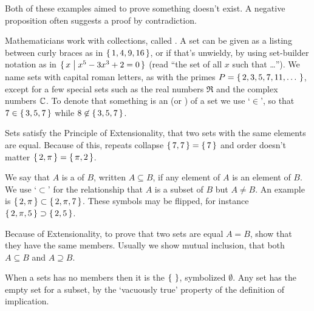 Both of these examples aimed to prove something doesn't exist.
A negative proposition often suggests a proof by contradiction.















Mathematicians work with collections, called . 
A set can be given as a listing between curly braces as in
\( \mbox{$\{\, 1,4,9,16 \,\}$} \), or if that's
unwieldy, by using set-builder notation as in
\( \mbox{$\{\,x\bigm| x^5-3x^3+2=0 \,\}$} \) (read ``the set of all \( x \)
such that \ldots'').
We name sets with capital roman letters, as with the primes
\( P=\mbox{$\{\,2,3,5,7,11,\ldots\,\,\}$} \), except for a few special sets such as the
real numbers \( \Re \)
and the complex numbers \( \mathbb{C} \).
To denote that something is an 
(or ) of a set we
use `\(\in \)',
so that \( 7\in\mbox{$\{\,3,5,7\,\}$} \) while \( 8\not\in\mbox{$\{\,3,5,7\,\}$} \).

Sets satisfy
the Principle of Extensionality, that two sets with the same elements
are equal.
Because of this, 
repeats collapse \( \mbox{$\{\,7,7\,\}$}=\mbox{$\{\,7\,\}$} \) and order doesn't
matter \( \mbox{$\{\,2,\pi\,\}$}=\mbox{$\{\,\pi,2\,\}$} \).

We say that \( A \) is a  of \( B \), written
$A\subseteq B$, if any element of $A$ is an element of $B$.
We use
`\( \subset \)' for the  %
relationship that \( A \) is a subset of \( B \) but \( A\neq B \).
An example is 
\( \mbox{$\{\,2,\pi\,\}$}\subset\mbox{$\{\,2,\pi,7\,\}$} \).
These symbols may be flipped, for instance
\( \mbox{$\{\, 2,\pi,5\,\}$}\supset\mbox{$\{\,2,5\,\}$} \).

Because of Extensionality, to prove that two sets are equal \( A=B \),
show that they have the same members.
Usually we show mutual inclusion,%
that both \( A\subseteq B \) and \( A\supseteq B \).

When a sets has no members then it is
the  \( \mbox{$\{\,\,\}$} \),
symbolized \( \emptyset \).
Any set has the empty set for a subset, by the `vacuously true'
property of the definition of implication.


